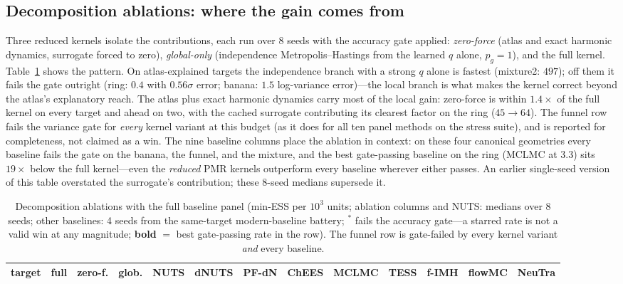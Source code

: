 \documentclass[11pt]{article}
\theoremstyle{remark}
\begin{document}
\subsection{Decomposition ablations: where the gain comes from}
\label{sec:ablation}
Three reduced kernels isolate the contributions, each run over 8 seeds
with the accuracy gate applied: \emph{zero-force} (atlas and exact
harmonic dynamics, surrogate forced to zero), \emph{global-only}
(independence Metropolis--Hastings from the learned $q$ alone,
$p_g{=}1$), and the full kernel. Table~\ref{tab:decomp} shows the
pattern. On atlas-explained targets the independence branch with a
strong $q$ alone is fastest (mixture2: $497$); off them it fails the
gate outright (ring: $0.4$ with $0.56\sigma$ error; banana:
$1.5$ log-variance error)---the local branch is what makes the kernel
correct beyond the atlas's explanatory reach. The atlas plus exact
harmonic dynamics carry most of the local gain: zero-force is within
$1.4\times$ of the full kernel on every target and ahead on two, with
the cached surrogate contributing its clearest factor on the ring
($45\to64$). The funnel row fails the variance gate for \emph{every}
kernel variant at this budget (as it does for all ten panel methods on
the stress suite), and is reported for completeness, not claimed as a
win. The nine baseline columns place the ablation in context: on these
four canonical geometries every baseline fails the gate on the banana,
the funnel, and the mixture, and the best gate-passing baseline on the
ring (MCLMC at $3.3$) sits $19\times$ below the full kernel---even the
\emph{reduced} PMR kernels outperform every baseline wherever either
passes. An earlier single-seed version of this table overstated the
surrogate's contribution; these 8-seed medians supersede it.

\begin{table}[t]
\caption{Decomposition ablations with the full baseline panel (min-ESS
per $10^3$ units; ablation columns and NUTS: medians over 8 seeds;
other baselines: 4 seeds from the same-target modern-baseline battery;
$^{*}$ fails the accuracy gate---a starred rate is not a valid win at
any magnitude; \textbf{bold} $=$ best gate-passing rate in the row).
The funnel row is gate-failed by every kernel variant \emph{and} every
baseline.}
\label{tab:decomp}
\centering\footnotesize
\setlength{\tabcolsep}{3.0pt}
\begin{tabular}{lrrrrrrrrrrrr}
\toprule
target & full & zero-f. & glob. & NUTS & dNUTS & PF-dN & ChEES & MCLMC
 & TESS & f-IMH & flowMC & NeuTra\\
\midrule

\end{tabular}
\end{table}
\end{document}
